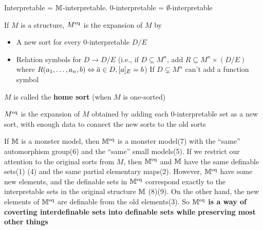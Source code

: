 \documentclass[11pt]{article}
\begin{document}
Interpretable = \(\mathbb{M}\)-interpretable. 0-interpretable = \(\emptyset\)-interpretable

\begin{definition}[]
If \(M\) is a structure, \(M^{\operatorname{eq}}\) is the expansion of \(M\) by
\begin{itemize}
\item A new sort for every 0-interpretable \(D/E\)
\item Relation symbols for \(D\to D/E\) (i.e., if \(D\subseteq M^n\), add \(R\subseteq M^n\times(D/E)\)
where \(R(a_1,\dots,a_n,b)\Leftrightarrow\bara\in D,[a]_E=b\)) If \(D\subsetneq M^n\) can't add a function symbol
\end{itemize}


\(M\) is called the \textbf{home sort} (when \(M\) is one-sorted)
\end{definition}

\(M^{\operatorname{eq}}\) is the expansion of \(M\) obtained by adding each 0-interpretable set as a new sort,
with enough data to connect the new sorts to the old sorts

If \(\mathbb{M}\) is a monster model, then \(\mathbb{M}^{\operatorname{eq}}\) is a monster model(7) with the ``same'' automorphism
group(6) and the ``same'' small models(5). If we restrict our attention to the original sorts from
\(M\), then \(\mathbb{M}^{\operatorname{eq}}\) and \(\mathbb{M}\) have the same definable sets(1) (4) and the same partial
elementary maps(2). However, \(\mathbb{M}^{\operatorname{eq}}\) have some new elements, and the definable sets
in \(\mathbb{M}^{\operatorname{eq}}\) correspond exactly to the interpretable sets in the original structure \(\mathbb{M}\)
(8)(9). On the other hand, the new elements of \(\mathbb{M}^{\operatorname{eq}}\) are definable from the old
elements(3). So \textbf{\(\mathbb{M}^{\operatorname{eq}}\) is a way of coverting interdefinable sets into definable sets while}
\textbf{preserving most other things}
\end{document}
